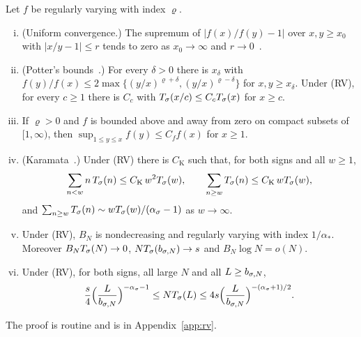 \begin{lemma}\label{lem:rv}
Let $f$ be regularly varying with index $\varrho$.
\begin{enumerate}[(i)]
\item (Uniform convergence.) The supremum of $|f(x)/f(y)-1|$ over $x,y\ge x_0$
with $|x/y-1|\le r$ tends to zero as $x_0\to\infty$ and
$r\to0$~\cite[Theorems~1.2.1 and~1.5.2]{bgt1989}.
\item (Potter's bounds~\cite[Theorem~1.5.6]{bgt1989}.) For every $\delta>0$ there is
$x_\delta$ with $f(y)/f(x)\le2\max\{(y/x)^{\varrho+\delta},(y/x)^{\varrho-\delta}\}$ for
$x,y\ge x_\delta$. Under (RV), for every $c\ge1$ there is $C_c$ with
$T_\sigma(x/c)\le C_cT_\sigma(x)$ for $x\ge c$.
\item \cite[Theorem~1.5.3]{bgt1989} If $\varrho>0$ and $f$ is bounded above and away
from zero on compact subsets of $[1,\infty)$, then $\sup_{1\le y\le x}f(y)\le C_ff(x)$
for $x\ge1$.
\item (Karamata~\cite[Propositions~1.5.8 and~1.5.10]{bgt1989}.) Under (RV) there is
$C_{\mathrm K}$ such that, for both signs and all $w\ge1$,
\begin{equation}\label{eq:karamata}
 \sum_{n<w}n\,T_\sigma(n)\le C_{\mathrm K}\,w^2T_\sigma(w),\qquad
 \sum_{n\ge w}T_\sigma(n)\le C_{\mathrm K}\,wT_\sigma(w),
\end{equation}
and $\sum_{n\ge w}T_\sigma(n)\sim wT_\sigma(w)/(\alpha_\sigma-1)$ as $w\to\infty$.
\item Under (RV), $B_N$ is nondecreasing and regularly varying with index
$1/\alpha_*$. Moreover $B_NT_\sigma(N)\to0$, $NT_\sigma(b_{\sigma,N})\to s$ and
$B_N\log N=o(N)$.
\item Under (RV), for both signs, all large $N$ and all $L\ge b_{\sigma,N}$,
\begin{equation}\label{eq:NT-bounds}
 \frac s4\Bigl(\frac L{b_{\sigma,N}}\Bigr)^{-\alpha_\sigma-1}\le NT_\sigma(L)\le4s\Bigl(\frac L{b_{\sigma,N}}\Bigr)^{-(\alpha_\sigma+1)/2}.
\end{equation}
\end{enumerate}
\end{lemma}

The proof is routine and is in Appendix~\ref{app:rv}.

